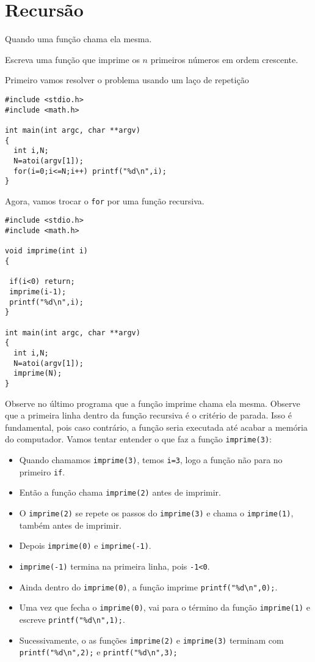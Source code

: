 \section{Recursão}
Quando uma função chama ela mesma. 
\begin{ex}Escreva uma função que imprime os $n$ primeiros números em ordem crescente.
\end{ex}
Primeiro vamos resolver o problema usando um laço de repetição
\begin{verbatim}
#include <stdio.h>
#include <math.h>

int main(int argc, char **argv)
{
  int i,N;
  N=atoi(argv[1]);
  for(i=0;i<=N;i++) printf("%d\n",i);
} 
\end{verbatim}
Agora, vamos trocar o \verb|for| por uma função recursiva.
\begin{verbatim}
#include <stdio.h>
#include <math.h>

void imprime(int i)
{
 
 if(i<0) return;
 imprime(i-1);  
 printf("%d\n",i);
}

int main(int argc, char **argv)
{
  int i,N;
  N=atoi(argv[1]);
  imprime(N); 
}
\end{verbatim}
Observe no último programa que a função imprime chama ela mesma. Observe que a primeira linha dentro da função recursiva é o critério de parada. Isso é fundamental, pois caso contrário, a função seria executada até acabar a memória do computador. Vamos tentar entender o que faz a função \verb|imprime(3)|:
\begin{itemize}
 \item Quando chamamos \verb|imprime(3)|, temos \verb|i=3|, logo a função não para no primeiro \verb|if|.
 \item Então a função chama \verb|imprime(2)| antes de imprimir.
 \item O \verb|imprime(2)| se repete os passos do \verb|imprime(3)| e chama o \verb|imprime(1)|, também  antes de imprimir.
 \item Depois \verb|imprime(0)| e \verb|imprime(-1)|. 
 \item \verb|imprime(-1)| termina na primeira linha, pois \verb|-1<0|.
 \item Ainda dentro do \verb|imprime(0)|, a função imprime \verb|printf("%d\n",0);|.
 \item Uma vez que fecha o \verb|imprime(0)|, vai para o término da função \verb|imprime(1)| e escreve \verb|printf("%d\n",1);|.
  \item Sucessivamente, o as funções \verb|imprime(2)| e \verb|imprime(3)| terminam com \verb|printf("%d\n",2);| e \verb|printf("%d\n",3);|
\end{itemize}





